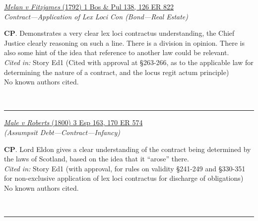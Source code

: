\documentclass[twoside]{article}
\begin{document}
        \begin{small}
        \begin{center}
        \href{https://heinonline.org/HOL/P?h=hein.engrep/engrg0126&i=826}{\textit{Melan v Fitzjames} (1792) 1 Bos \& Pul 138, 126 ER 822} \label{30} \\ 
\textit{Contract---Application of Lex Loci Con (Bond---Real Estate)}\\
        \end{center}
        \textbf{CP}. Demonstrates a very clear lex loci contractus understanding, the Chief Justice clearly reasoning on such a line. There is a division in opinion. There is also some hint of the idea that reference to another law could be relevant.\\\textit{Cited in: }Story Ed1 (Cited with approval at §263-266, as to the applicable law for determining the nature of a contract, and the locus regit actum principle)\\No known authors cited.
        \end{small}\\
        \rule{\textwidth}{0.5pt}
        

        \begin{small}
        \begin{center}
        \href{https://heinonline.org/HOL/P?h=hein.engrep/engrk0170&i=578}{\textit{Male v Roberts} (1800) 3 Esp 163, 170 ER 574} \label{9} \\ 
\textit{ (Assumpsit Debt---Contract---Infancy)}\\
        \end{center}
        \textbf{CP}. Lord Eldon gives a clear understanding of the contract being determined by the laws of Scotland, based on the idea that it “arose” there.\\\textit{Cited in: }Story Ed1 (with approval, for rules on validity §241-249 and §330-351 for non-exclusive application of lex loci contractus for discharge of obligations)\\No known authors cited.
        \end{small}\\
        \rule{\textwidth}{0.5pt}
        
\end{document}
